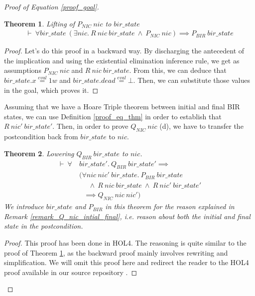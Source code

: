\documentclass{kththesis}
\newcommand{\eqeval}{\stackrel{eval}{=}}
\newtheorem{theorem}{Theorem}[section]
\begin{document}
{\begin{proof}[Proof of Equation \ref{proof_goal}]
\begin{theorem} \label{proof_b_thm}
Lifting of $P_{NIC}~nic$ to $bir\_state$
\begin{equation*} \label{proof_b_thm_eq}
\begin{split}
\vdash~\forall bir\_state~(\exists nic.~R~nic~bir\_state~\land~P_{NIC}~nic) \implies P_{BIR}~bir\_state
\end{split}
\end{equation*}
\end{theorem}

\begin{proof}
Let's do this proof in a backward way. By discharging the antecedent of the implication and using the existential elimination inference rule, we get as assumptions $P_{NIC}~nic$ and $R~nic~bir\_state$. From this, we can deduce that $bir\_state.x \eqeval 1w$ and $bir\_state.dead \eqeval \bot$. Then, we can substitute those values in the goal, which proves it.
\end{proof}

Assuming that we have a Hoare Triple theorem between initial and final BIR states, we can use Definition \ref{proof_eq_thm} in order to establish that $R~nic'~bir\_state'$. Then, in order to prove $Q_{NIC}~nic$ (d), we have to transfer the postcondition back from $bir\_state$ to $nic$.

\begin{theorem} \label{proof_d_thm}
Lowering $Q_{BIR}~bir\_state$ to $nic$.
\begin{equation*} \label{proof_d_thm_eq}
\begin{split}
\vdash~\forall~&bir\_state'.~Q_{BIR}~bir\_state' \implies\\
	&(\forall nic~nic'~bir\_state.~P_{BIR}~bir\_state\\
	&~~~~~~\land~R~nic~bir\_state~\land~R~nic'~bir\_state'\\
	&~~~\implies Q_{NIC}~nic~nic')
\end{split}
\end{equation*}
We introduce $bir\_state$ and $P_{BIR}$ in this theorem for the reason explained in Remark \ref{remark_Q_nic_intial_final}, i.e. reason about both the initial and final state in the postcondition.
\end{theorem}

\begin{proof}
This proof has been done in HOL4. The reasoning is quite similar to the proof of Theorem \ref{proof_b_thm}, as the backward proof mainly involves rewriting and simplification. We will omit this proof here and redirect the reader to the HOL4 proof available in our source repository \cite{lacroix_trustful_2019}.
\end{proof}


\end{proof}}
\end{document}

